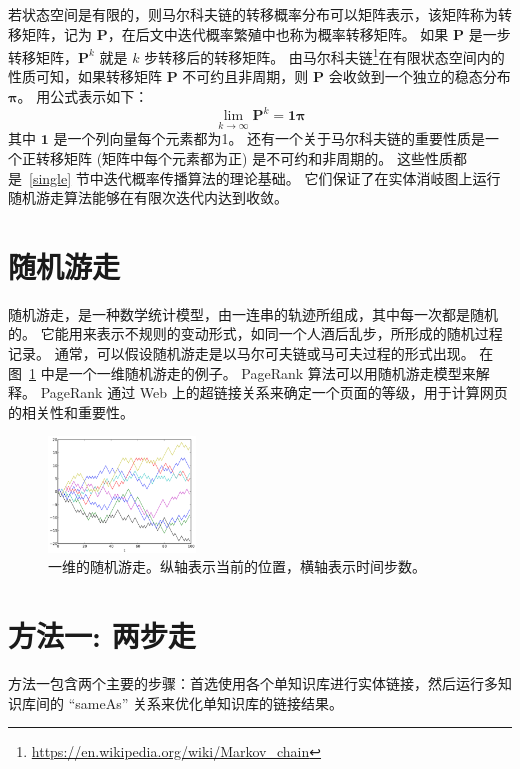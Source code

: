 若状态空间是有限的，则马尔科夫链的转移概率分布可以矩阵表示，该矩阵称为转移矩阵，记为 $\bm{P}$，在后文中迭代概率繁殖中也称为概率转移矩阵。
如果 $\bm{P}$ 是一步转移矩阵，$\bm{P}^k$ 就是 $k$ 步转移后的转移矩阵。
由马尔科夫链\footnote{\url{https://en.wikipedia.org/wiki/Markov_chain}}在有限状态空间内的性质\cite{tauchen1986finite}可知，如果转移矩阵 $\bm{P}$ 不可约且非周期，则 $\bm{P}$ 会收敛到一个独立的稳态分布 $\bm{\pi}$。
用公式表示如下：
\begin{equation}
	\lim_{k \rightarrow \infty} \bm{P}^k = \bm{1} \bm{\pi}
\label{pk}
\end{equation}
其中 $\bm{1}$ 是一个列向量每个元素都为1。
还有一个关于马尔科夫链的重要性质是一个正转移矩阵 (矩阵中每个元素都为正) 是不可约和非周期的。
这些性质都是~\ref{single} 节中迭代概率传播算法的理论基础。
它们保证了在实体消岐图上运行随机游走算法能够在有限次迭代内达到收敛。


\section{随机游走}
随机游走，是一种数学统计模型，由一连串的轨迹所组成，其中每一次都是随机的。
它能用来表示不规则的变动形式，如同一个人酒后乱步，所形成的随机过程记录。
通常，可以假设随机游走是以马尔可夫链或马可夫过程的形式出现。
在图~\ref{random_walk} 中是一个一维随机游走的例子。
PageRank\cite{page1999pagerank} 算法可以用随机游走模型来解释\cite{haveliwala2003topic}。
PageRank 通过 Web 上的超链接关系来确定一个页面的等级，用于计算网页的相关性和重要性。

\begin{figure}[htbp]
\centering
\includegraphics[width=0.35\textwidth]{img/random_walk}
\caption{一维的随机游走。纵轴表示当前的位置，横轴表示时间步数。}
\label{random_walk}
\end{figure}


\section{方法一: 两步走}\label{approach1}

方法一包含两个主要的步骤：首选使用各个单知识库进行实体链接，然后运行多知识库间的 ``sameAs'' 关系来优化单知识库的链接结果。

